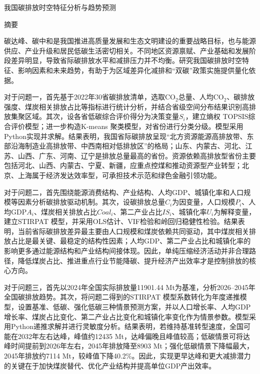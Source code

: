 \documentclass[UTF8,zihao=-4,fontset=fandol]{ctexart}
\begin{document}


\clearpage
\setcounter{page}{1}

\begin{center}
{\heiti{} 我国碳排放时空特征分析与趋势预测}
\end{center}

\begin{center}
{\heiti{} 摘要}
\end{center}

碳达峰、碳中和是我国推进高质量发展和生态文明建设的重要战略目标，也与能源供应、产业升级和居民低碳生活密切相关。不同地区资源禀赋、产业基础和发展阶段差异明显，导致省际碳排放水平和减排压力并不均衡。研究我国碳排放时空特征、影响因素和未来趋势，有助于为区域差异化减排和“双碳”政策实施提供量化依据。

{\heiti 对于问题一}，首先基于2022年30省碳排放清单，选取CO$_2$总量、人均CO$_2$、碳排放强度、煤炭相关排放占比等指标进行统计分析，并结合省级空间分布结果识别高排放集聚区域。其次，设各省低碳综合评价得分为决策变量$S_i$，建立{\heiti 熵权 TOPSIS}综合评价模型；进一步构造{\heiti K-means 聚类}模型，对省份进行分类分级。模型采用Python实现并求解。结果表明，我国省际碳排放呈现“北方资源能源高排放带、东部沿海制造业高排放带、中西南相对低排放区”的格局；山东、内蒙古、河北、江苏、山西、广东、河南、辽宁是排放总量最高的省份。资源依赖高排放型省份主要包括河北、山西、内蒙古、宁夏、新疆，应重点控煤和推动资源型产业转型；北京、上海属于经济发达效率型，可承担技术示范和绿色金融引领功能。

{\heiti 对于问题二}，首先围绕能源消费结构、产业结构、人均GDP、城镇化率和人口规模等因素分析碳排放驱动机制。其次，设碳排放总量$C_i$为因变量，人口规模$P_i$、人均GDP$A_i$、煤炭相关排放占比$Coal_i$、第二产业占比$IS_i$、城镇化率$U_i$为解释变量，建立{\heiti STIRPAT 模型}，并采用{\heiti OLS}估计、{\heiti VIF}检验和{\heiti 岭回归}稳健性检验。结果表明，当前省际碳排放差异最主要由人口规模和煤炭依赖共同驱动，其中煤炭相关排放占比是最关键、最稳定的结构性因素；人均GDP、第二产业占比和城镇化率的影响更多通过能源结构和产业结构间接体现。因此，单纯压缩经济活动并非合理路径，降低煤炭占比、推进重点行业节能降碳、提升经济产出效率才是控制排放的核心方向。

{\heiti 对于问题三}，首先以2024年全国实际排放量11901.44 Mt为基准，分析2026--2045年全国碳排放趋势。其次，将问题二得到的{\heiti STIRPAT 模型}系数转化为年度递推模型，设置基准、低碳、强化低碳三种{\heiti 情景预测}方案，并以人口增长率、人均GDP增长率、煤炭占比变化、第二产业占比变化和城镇化率变化作为情景参数。模型采用Python递推求解并进行灵敏度分析。结果表明，若维持基准转型速度，全国可能在2032年左右达峰，峰值约12435 Mt，达峰偏晚且峰值较高；低碳情景可将达峰时间提前到2026年左右，2045年排放降至8903 Mt；强化低碳情景下降幅最大，2045年排放约7114 Mt，较峰值下降40.2\%。因此，实现更早达峰和更大减排潜力的关键在于加快煤炭替代、优化产业结构并提高单位GDP产出效率。
\end{document}
